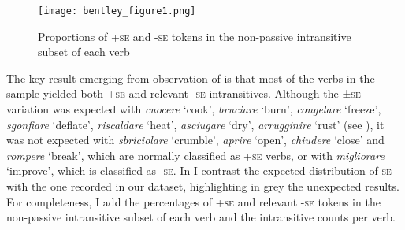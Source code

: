 \documentclass[output=paper,colorlinks,citecolor=brown
]{langscibook}
\begin{document}
\begin{figure}[hbt!]
\centering
\texttt{[image: bentley\_figure1.png]}
\caption{\label{fig:bentley_figure_1}Proportions of +\textsc{se} and -\textsc{se} tokens in the non-passive intransitive subset of each verb}
\end{figure}    

The key result emerging from observation of  is that most of the verbs in the sample yielded both +\textsc{se} and relevant -\textsc{se} intransitives. Although the ±\textsc{se} variation was expected with \textit{cuocere} ‘cook’, \textit{bruciare} ‘burn’, \textit{congelare} ‘freeze’, \textit{sgonfiare} ‘deflate’, \textit{riscaldare} ‘heat’, \textit{asciugare} ‘dry’, \textit{arrugginire} ‘rust’ (see ), it was not expected with \textit{sbriciolare} ‘crumble’, \textit{aprire} ‘open’, \textit{chiudere} ‘close’ and \textit{rompere} ‘break’, which are normally classified as +\textsc{se} verbs, or with \textit{migliorare} ‘improve’, which is classified as -\textsc{se}. In  I contrast the expected distribution of \textsc{se} with the one recorded in our dataset, highlighting in grey the unexpected results. For completeness, I add the percentages of +\textsc{se} and relevant -\textsc{se} tokens in the non-passive intransitive subset of each verb and the intransitive counts per verb.
\end{document}
